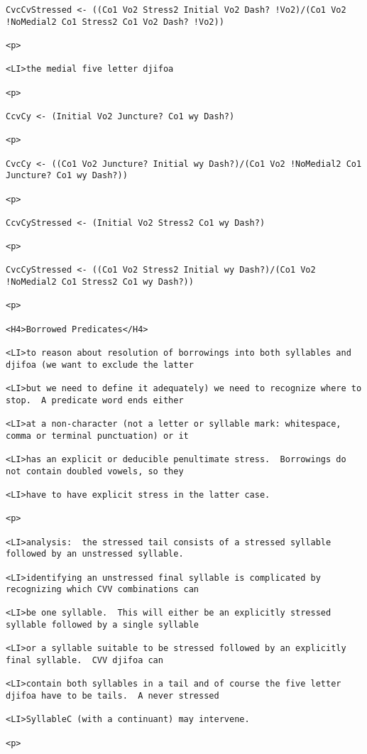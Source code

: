 \documentclass[12pt]{article}
\begin{document}
\begin{lstlisting}
CvcCvStressed <- ((Co1 Vo2 Stress2 Initial Vo2 Dash? !Vo2)/(Co1 Vo2 !NoMedial2 Co1 Stress2 Co1 Vo2 Dash? !Vo2))

<p>

<LI>the medial five letter djifoa

<p>

CcvCy <- (Initial Vo2 Juncture? Co1 wy Dash?)

<p>

CvcCy <- ((Co1 Vo2 Juncture? Initial wy Dash?)/(Co1 Vo2 !NoMedial2 Co1 Juncture? Co1 wy Dash?))

<p>

CcvCyStressed <- (Initial Vo2 Stress2 Co1 wy Dash?)

<p>

CvcCyStressed <- ((Co1 Vo2 Stress2 Initial wy Dash?)/(Co1 Vo2 !NoMedial2 Co1 Stress2 Co1 wy Dash?))

<p>

<H4>Borrowed Predicates</H4>

<LI>to reason about resolution of borrowings into both syllables and djifoa (we want to exclude the latter

<LI>but we need to define it adequately) we need to recognize where to stop.  A predicate word ends either

<LI>at a non-character (not a letter or syllable mark: whitespace, comma or terminal punctuation) or it

<LI>has an explicit or deducible penultimate stress.  Borrowings do not contain doubled vowels, so they

<LI>have to have explicit stress in the latter case.

<p>

<LI>analysis:  the stressed tail consists of a stressed syllable followed by an unstressed syllable.

<LI>identifying an unstressed final syllable is complicated by recognizing which CVV combinations can

<LI>be one syllable.  This will either be an explicitly stressed syllable followed by a single syllable

<LI>or a syllable suitable to be stressed followed by an explicitly final syllable.  CVV djifoa can

<LI>contain both syllables in a tail and of course the five letter djifoa have to be tails.  A never stressed

<LI>SyllableC (with a continuant) may intervene.

<p>


\end{lstlisting}
\end{document}
